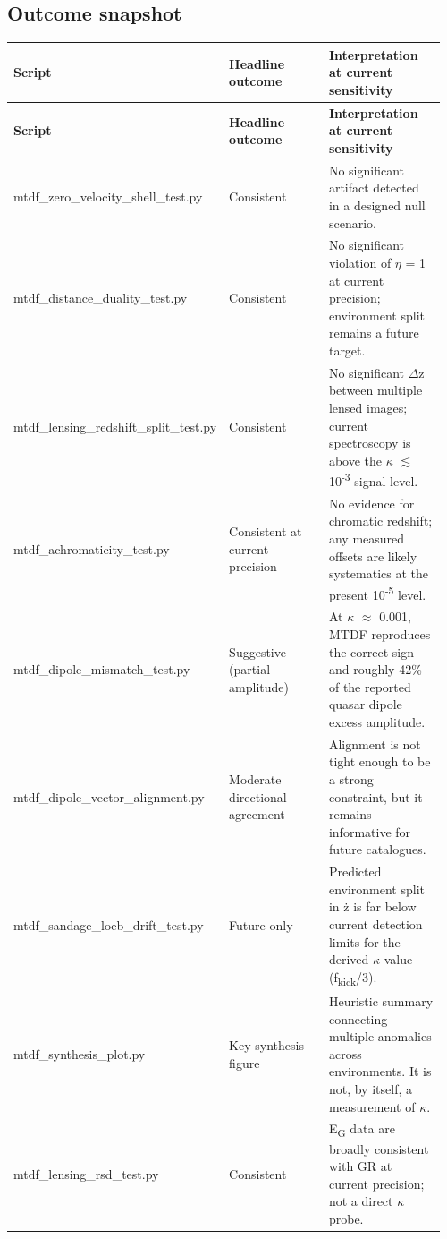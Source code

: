 \documentclass[11pt,a4paper]{article}
\begin{document}
\subsection{Outcome snapshot}
\begingroup\footnotesize
\begin{longtable}{>{\RaggedRight\arraybackslash}p{0.320\linewidth}>{\RaggedRight\arraybackslash}p{0.320\linewidth}>{\RaggedRight\arraybackslash}p{0.320\linewidth}}
\toprule
\textbf{Script} & \textbf{Headline outcome} & \textbf{Interpretation at current sensitivity} \tabularnewline
\midrule\endfirsthead
\toprule
\textbf{Script} & \textbf{Headline outcome} & \textbf{Interpretation at current sensitivity} \tabularnewline
\midrule\endhead
\bottomrule\endfoot
mtdf\_\allowbreak{}zero\_\allowbreak{}velocity\_\allowbreak{}shell\_\allowbreak{}test.py & Consistent & No significant artifact detected in a designed null scenario. \tabularnewline
mtdf\_\allowbreak{}distance\_\allowbreak{}duality\_\allowbreak{}test.py & Consistent & No significant violation of $\eta$ = 1 at current precision; environment split remains a future target. \tabularnewline
mtdf\_\allowbreak{}lensing\_\allowbreak{}redshift\_\allowbreak{}split\_\allowbreak{}test.py & Consistent & No significant $\Delta$z between multiple lensed images; current spectroscopy is above the $\kappa$ $\lesssim$ 10\textsuperscript{-3} signal level. \tabularnewline
mtdf\_\allowbreak{}achromaticity\_\allowbreak{}test.py & Consistent at current precision & No evidence for chromatic redshift; any measured offsets are likely systematics at the present 10\textsuperscript{-5} level. \tabularnewline
mtdf\_\allowbreak{}dipole\_\allowbreak{}mismatch\_\allowbreak{}test.py & Suggestive (partial amplitude) & At $\kappa$ $\approx$ 0.001, MTDF reproduces the correct sign and roughly 42\% of the reported quasar dipole excess amplitude. \tabularnewline
mtdf\_\allowbreak{}dipole\_\allowbreak{}vector\_\allowbreak{}alignment.py & Moderate directional agreement & Alignment is not tight enough to be a strong constraint, but it remains informative for future catalogues. \tabularnewline
mtdf\_\allowbreak{}sandage\_\allowbreak{}loeb\_\allowbreak{}drift\_\allowbreak{}test.py & Future-only & Predicted environment split in \.{z} is far below current detection limits for the derived $\kappa$ value (f\textsubscript{kick}/3). \tabularnewline
mtdf\_\allowbreak{}synthesis\_\allowbreak{}plot.py & Key synthesis figure & Heuristic summary connecting multiple anomalies across environments. It is not, by itself, a measurement of $\kappa$. \tabularnewline
mtdf\_\allowbreak{}lensing\_\allowbreak{}rsd\_\allowbreak{}test.py & Consistent & E\textsubscript{G} data are broadly consistent with GR at current precision; not a direct $\kappa$ probe. \tabularnewline

\end{longtable}
\end{document}
